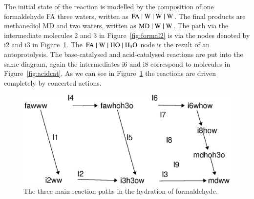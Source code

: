 The initial state of the reaction is modelled by the composition of one 
formaldehyde FA three waters, written as $\mathrm{FA \; \vert \; W \; \vert \; W \; \vert \; W}$. 
The final products are methanediol $\mathrm{MD}$ and two waters,
written as $\mathrm{MD \; \vert \; W \; \vert \; W}$. The path via the intermediate molecules 2 and 3 
in Figure~\ref{fig:formal2} is via the nodes denoted by i2 and i3 in Figure~\ref{fig:formal_graph}.
The $\mathrm{FA \; \vert \; W \; \vert \; HO \; \vert \; H_3O}$ 
node is the result of an autoprotolysis. The base-catalysed and acid-catalysed reactions 
are put into the same diagram, again the intermediates i6 and i8 correspond to molecules 
in Figure~\ref{fig:acidcat}. 
%
%
As we can see in Figure~\ref{fig:formal_graph} the reactions are driven completely by 
concerted actions. 
%

\begin{figure}[t]


\centering
    \includegraphics[width=1.0\textwidth]{formal_all}
\caption{The three main reaction paths in the hydration of formaldehyde.}
\label{fig:formal_graph}
\end{figure}

